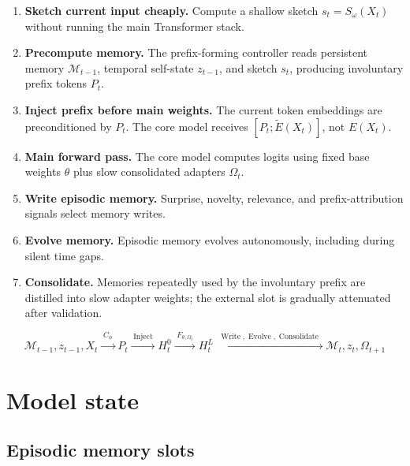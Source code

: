 \documentclass[11pt]{article}
\newcommand{\Evolve}{\operatorname{Evolve}}
\newcommand{\Write}{\operatorname{Write}}
\newcommand{\Consolidate}{\operatorname{Consolidate}}
\newcommand{\Mem}{\mathcal{M}}
\begin{document}
\begin{enumerate}
    \item \textbf{Sketch current input cheaply.} Compute a shallow sketch \(s_t=S_\omega(X_t)\) without running the main Transformer stack.
    \item \textbf{Precompute memory.} The prefix-forming controller reads persistent memory \(\Mem_{t-1}\), temporal self-state \(z_{t-1}\), and sketch \(s_t\), producing involuntary prefix tokens \(P_t\).
    \item \textbf{Inject prefix before main weights.} The current token embeddings are preconditioned by \(P_t\). The core model receives \([P_t; \tilde{E}(X_t)]\), not \(E(X_t)\).
    \item \textbf{Main forward pass.} The core model computes logits using fixed base weights \(\theta\) plus slow consolidated adapters \(\Omega_t\).
    \item \textbf{Write episodic memory.} Surprise, novelty, relevance, and prefix-attribution signals select memory writes.
    \item \textbf{Evolve memory.} Episodic memory evolves autonomously, including during silent time gaps.
    \item \textbf{Consolidate.} Memories repeatedly used by the involuntary prefix are distilled into slow adapter weights; the external slot is gradually attenuated after validation.
\end{enumerate}

\begin{equation}
\boxed{
\Mem_{t-1},z_{t-1},X_t
\xrightarrow{\;C_\phi\;}
P_t
\xrightarrow{\;\operatorname{Inject}\;}
H_t^0
\xrightarrow{\;F_{\theta,\Omega_t}\;}
H_t^L
\xrightarrow{\;\Write,\Evolve,\Consolidate\;}
\Mem_t,z_t,\Omega_{t+1}
}
\end{equation}

\section{Model state}

\subsection{Episodic memory slots}
\end{document}
